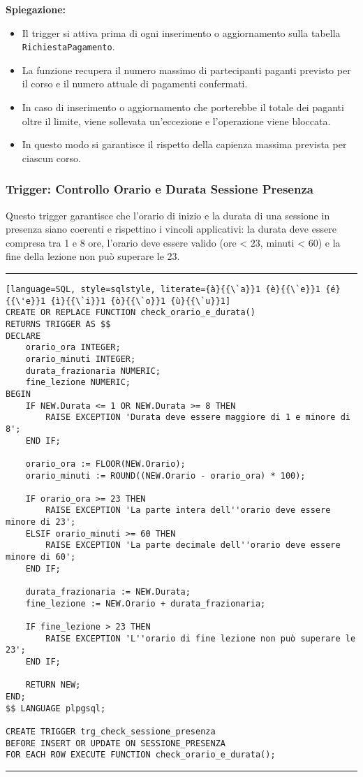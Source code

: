 \textbf{Spiegazione:}
\begin{itemize}
    \item Il trigger si attiva prima di ogni inserimento o aggiornamento sulla tabella \texttt{RichiestaPagamento}.
    \item La funzione recupera il numero massimo di partecipanti paganti previsto per il corso e il numero attuale di pagamenti confermati.
    \item In caso di inserimento o aggiornamento che porterebbe il totale dei paganti oltre il limite, viene sollevata un'eccezione e l'operazione viene bloccata.
    \item In questo modo si garantisce il rispetto della capienza massima prevista per ciascun corso.
\end{itemize}
\subsubsection{Trigger: Controllo Orario e Durata Sessione Presenza}

Questo trigger garantisce che l'orario di inizio e la durata di una sessione in presenza siano coerenti e rispettino i vincoli applicativi: la durata deve essere compresa tra 1 e 8 ore, l'orario deve essere valido (ore < 23, minuti < 60) e la fine della lezione non può superare le 23.

\noindent\rule{\textwidth}{0.4pt}
\begin{lstlisting}[language=SQL, style=sqlstyle, literate={à}{{\`a}}1 {è}{{\`e}}1 {é}{{\'e}}1 {ì}{{\`i}}1 {ò}{{\`o}}1 {ù}{{\`u}}1]
CREATE OR REPLACE FUNCTION check_orario_e_durata()
RETURNS TRIGGER AS $$
DECLARE
    orario_ora INTEGER;
    orario_minuti INTEGER;
    durata_frazionaria NUMERIC;
    fine_lezione NUMERIC;
BEGIN
    IF NEW.Durata <= 1 OR NEW.Durata >= 8 THEN
        RAISE EXCEPTION 'Durata deve essere maggiore di 1 e minore di 8';
    END IF;

    orario_ora := FLOOR(NEW.Orario);
    orario_minuti := ROUND((NEW.Orario - orario_ora) * 100);

    IF orario_ora >= 23 THEN
        RAISE EXCEPTION 'La parte intera dell''orario deve essere minore di 23';
    ELSIF orario_minuti >= 60 THEN
        RAISE EXCEPTION 'La parte decimale dell''orario deve essere minore di 60';
    END IF;

    durata_frazionaria := NEW.Durata;
    fine_lezione := NEW.Orario + durata_frazionaria;

    IF fine_lezione > 23 THEN
        RAISE EXCEPTION 'L''orario di fine lezione non può superare le 23';
    END IF;

    RETURN NEW;
END;
$$ LANGUAGE plpgsql;

CREATE TRIGGER trg_check_sessione_presenza
BEFORE INSERT OR UPDATE ON SESSIONE_PRESENZA
FOR EACH ROW EXECUTE FUNCTION check_orario_e_durata();
\end{lstlisting}
\noindent\rule{\textwidth}{0.4pt}

